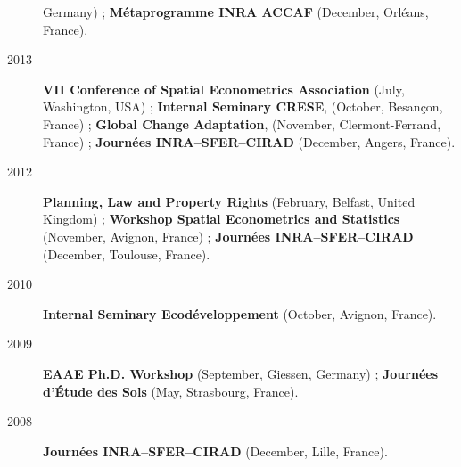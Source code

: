 \documentclass[11pt, a4paper]{./style}
\begin{document}
\begin{description}
Germany) ; \textbf{Métaprogramme INRA ACCAF} (December, Orléans, France).
\item[{2013}] \textbf{VII Conference of Spatial Econometrics Association}
(July, Washington, USA) ; \textbf{Internal Seminary CRESE}, (October,
Besançon, France) ; \textbf{Global Change Adaptation}, (November,
Clermont-Ferrand, France) ; \textbf{Journées INRA--SFER--CIRAD}
(December, Angers, France).
\item[{2012}] \textbf{Planning, Law and Property Rights} (February, Belfast,
United Kingdom) ; \textbf{Workshop Spatial Econometrics and Statistics}
(November, Avignon, France) ; \textbf{Journées INRA--SFER--CIRAD}
(December, Toulouse, France).
\item[{2010}] \textbf{Internal Seminary Ecodéveloppement} (October, Avignon,
France).
\item[{2009}] \textbf{EAAE Ph.D. Workshop} (September, Giessen, Germany) ;
\textbf{Journées d'Étude des Sols} (May, Strasbourg, France).
\item[{2008}] \textbf{Journées INRA--SFER--CIRAD} (December, Lille, France).
\end{description}

\label{sec:org3c23302}
\label{sec:orgb15aa81}
\end{document}
